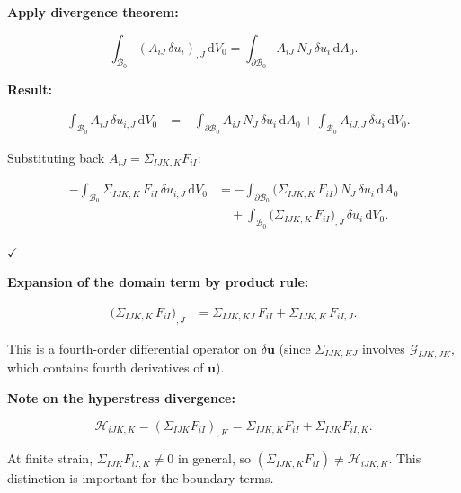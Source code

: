 \documentclass[11pt]{article}
\newcommand{\bu}{\mathbf{u}}
\newcommand{\bu}{\mathbf{u}}
\begin{document}
\textbf{Apply divergence theorem:}

\begin{equation}
\int_{\mathcal{B}_{0}}(A_{iJ}\,\delta u_{i})_{,J}\,\mathrm{d}V_{0}
= \int_{\partial\mathcal{B}_{0}}A_{iJ}\,N_{J}\,\delta u_{i}\,
  \mathrm{d}A_{0}.
\end{equation}

\textbf{Result:}

\begin{align}
-\int_{\mathcal{B}_{0}}A_{iJ}\,\delta u_{i,J}\,\mathrm{d}V_{0}
&= -\int_{\partial\mathcal{B}_{0}}A_{iJ}\,N_{J}\,\delta u_{i}\,
   \mathrm{d}A_{0}
 + \int_{\mathcal{B}_{0}}A_{iJ,J}\,\delta u_{i}\,\mathrm{d}V_{0}.
\end{align}

Substituting back $A_{iJ}=\Sigma_{IJK,K}F_{iI}$:

\begin{align}
-\int_{\mathcal{B}_{0}}\Sigma_{IJK,K}\,F_{iI}\,
  \delta u_{i,J}\,\mathrm{d}V_{0}
&= -\int_{\partial\mathcal{B}_{0}}\bigl(\Sigma_{IJK,K}\,F_{iI}\bigr)\,
   N_{J}\,\delta u_{i}\,\mathrm{d}A_{0}
\nonumber\\
&\quad + \int_{\mathcal{B}_{0}}\bigl(\Sigma_{IJK,K}\,F_{iI}\bigr)_{,J}\,
   \delta u_{i}\,\mathrm{d}V_{0}.
\label{fd:ibp2}
\end{align}

$\checkmark$

\textbf{Expansion of the domain term by product rule:}

\begin{align}
\bigl(\Sigma_{IJK,K}\,F_{iI}\bigr)_{,J}
&= \Sigma_{IJK,KJ}\,F_{iI}
 + \Sigma_{IJK,K}\,F_{iI,J}.
\end{align}

This is a fourth-order differential operator on $\delta\bu$
(since $\Sigma_{IJK,KJ}$ involves $\mathcal{G}_{IJK,JK}$, which
contains fourth derivatives of $\bu$).

\textbf{Note on the hyperstress divergence:}

\begin{equation}
\mathcal{H}_{iJK,K}
= (\Sigma_{IJK}F_{iI})_{,K}
= \Sigma_{IJK,K}F_{iI} + \Sigma_{IJK}F_{iI,K}.
\end{equation}

At finite strain, $\Sigma_{IJK}F_{iI,K}\neq 0$ in general, so
$(\Sigma_{IJK,K}F_{iI}) \neq \mathcal{H}_{iJK,K}$.
This distinction is important for the boundary terms.

\end{document}
